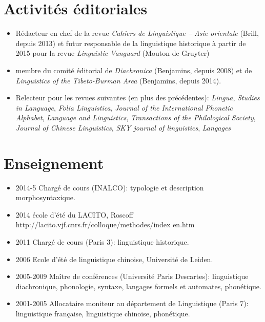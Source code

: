 \documentclass[oldfontcommands,oneside,a4paper,11pt]{article}
\begin{document}
 
  
  
 
\section*{Activités éditoriales}
\begin{itemize}
\item Rédacteur en chef de la revue \textit{Cahiers de Linguistique -- Asie orientale} (Brill, depuis 2013) et futur responsable de la linguistique historique à partir de 2015 pour la revue \textit{Linguistic Vanguard} (Mouton de Gruyter)
\item membre du comité éditorial de \textit{Diachronica} (Benjamins, depuis 2008) et de \textit{Linguistics of the Tibeto-Burman Area}  (Benjamins, depuis 2014).
\item Relecteur pour les revues suivantes (en plus des précédentes): \textit{Lingua}, \textit{Studies in Language}, \textit{Folia Linguistica}, \textit{Journal of the International Phonetic Alphabet},  \textit{Language and Linguistics}, \textit{Transactions of the Philological Society}, \textit{Journal of Chinese Linguistics}, \textit{SKY journal of linguistics}, \textit{Langages}
\end{itemize}

\section*{Enseignement}
\begin{itemize}
\item 2014-5 Chargé de cours (INALCO): typologie et description morphosyntaxique.
\item 2014 école d'été du LACITO, Roscoff http://lacito.vjf.cnrs.fr/colloque/methodes/index en.htm
\item 2011 Chargé de cours (Paris 3): linguistique historique.
\item  2006 Ecole d'été de linguistique chinoise, Université de Leiden.
\item 2005-2009 Maître de conférences (Université Paris Descartes): linguistique diachronique, phonologie, syntaxe, langages formels et automates, phonétique.
\item 2001-2005 Allocataire moniteur au département de Linguistique (Paris 7): linguistique française, linguistique chinoise, phonétique.
\end{itemize}
\end{document}
